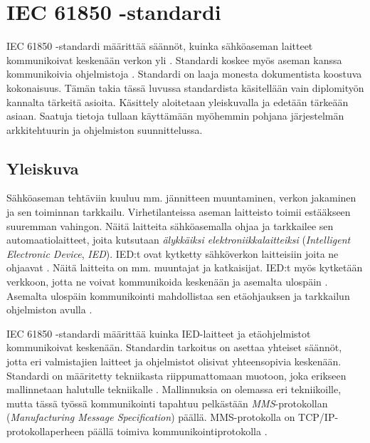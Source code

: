 \chapter{IEC 61850 -standardi}
\label{ch:iec61850-theory}
IEC 61850 -standardi määrittää säännöt, kuinka sähköaseman laitteet kommunikoivat keskenään verkon yli \cite[s.~1]{Kaneda2008}. Standardi koskee myös aseman kanssa kommunikoivia ohjelmistoja \cite[s.~10]{IEC61850-7-1}. Standardi on laaja monesta dokumentista koostuva kokonaisuus. Tämän takia tässä luvussa standardista käsitellään vain diplomityön kannalta tärkeitä asioita. Käsittely aloitetaan yleiskuvalla ja edetään tärkeään asiaan. Saatuja tietoja tullaan käyttämään myöhemmin pohjana järjestelmän arkkitehtuurin ja ohjelmiston suunnittelussa.


\section{Yleiskuva}
Sähköaseman tehtäviin kuuluu mm. jännitteen muuntaminen, verkon jakaminen ja sen toiminnan tarkkailu. Virhetilanteissa aseman laitteisto toimii estääkseen suuremman vahingon. Näitä laitteita sähköasemalla ohjaa ja tarkkailee sen automaatiolaitteet, joita kutsutaan \emph{älykkäiksi elektroniikkalaitteiksi} (\emph{Intelligent Electronic Device}, \emph{IED}). IED:t ovat kytketty sähköverkon laitteisiin joita ne ohjaavat \cite[s.~63--64]{IEC61850-7-1}. Näitä laitteita on mm. muuntajat ja katkaisijat. IED:t myös kytketään verkkoon, jotta ne voivat kommunikoida keskenään ja asemalta ulospäin \cite[s.~31]{IEC61850-7-1}. Asemalta ulospäin kommunikointi mahdollistaa sen etäohjauksen ja tarkkailun ohjelmiston avulla \cite[s.~1]{Brunner2008}.

IEC 61850 -standardi määrittää kuinka IED-laitteet ja etäohjelmistot kommunikoivat keskenään. Standardin tarkoitus on asettaa yhteiset säännöt, jotta eri valmistajien laitteet ja ohjelmistot olisivat yhteensopivia keskenään. Standardi on määritetty tekniikasta riippumattomaan muotoon, joka erikseen mallinnetaan halutulle tekniikalle \cite{IEC61850-1}. Mallinnuksia on olemassa eri tekniikoille, mutta tässä työssä kommunikointi tapahtuu pelkästään \emph{MMS}-protokollan (\emph{Manufacturing Message Specification}) päällä. MMS-protokolla on TCP/IP-protokollaperheen päällä toimiva kommunikointiprotokolla \cite{MMS-protocol-stack-and-API}.

